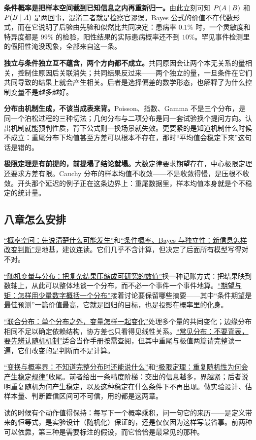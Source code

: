 \textbf{条件概率是把样本空间截到已知信息之内再重新归一。}由此立刻可知 \(P(A\mid B)\) 和 \(P(B\mid A)\) 是两回事，混淆二者就是检察官谬误。Bayes 公式的价值不在代数形式，而在它说明了后验由先验和似然比共同决定：患病率 \(0.1\%\) 时，一个灵敏度和特异度都是 \(99\%\) 的检验，阳性结果的实际患病概率还不到 \(10\%\)。罕见事件检测里的假阳性淹没现象，全部来自这一条。

\textbf{独立与条件独立互不蕴含，两个方向都不成立。}共同原因会让两个本无关系的量相关，控制住原因后关联消失；共同结果反过来——两个独立的量，一旦条件在它们共同导致的结果上就会产生相关。后者是选择偏差的数学形态，也解释了为什么控制变量不是越多越好。

\textbf{分布由机制生成，不该当成表来背。}Poisson、指数、Gamma 不是三个分布，是同一个泊松过程的三种切法；几何分布与二项分布是同一套试验换个提问方向。认出机制就能预判性质，背下公式则一换场景就失效。更要紧的是知道机制什么时候不成立：重尾分布下均值甚至方差可以根本不存在，那时``平均值会稳定下来''这句话是错的。

\textbf{极限定理是有前提的，前提塌了结论就塌。}大数定律要求期望存在，中心极限定理还要求方差有限。Cauchy 分布的样本均值不收敛——不是收敛得慢，是压根不收敛。开头那个延迟的例子正在这条边界上：重尾数据里，样本均值本身就是个不稳定的统计量。

\subsection{八章怎么安排}

\hyperref[ch:037]{``概率空间：先说清楚什么可能发生''}和\hyperref[ch:038]{``条件概率、Bayes 与独立性：新信息怎样改变判断''}是地基，建议连读。它们几乎不含计算，但决定了后面所有模型写得对不对。

\hyperref[ch:039]{``随机变量与分布：把复杂结果压缩成可研究的数值''}换一种记账方式：把结果映到数轴上，从此可以整体地谈一个分布，而不必一个事件一个事件地算。\hyperref[ch:040]{``期望与矩：怎样用少量数字概括一个分布''}接着讨论要保留哪些摘要——其中``条件期望是最佳预测''一篇价值最高，它就是回归的目标，也是投影在概率里的化身。

\hyperref[ch:041]{``联合分布：单个分布之外，变量怎样一起变化''}处理多个量的共同变化；边缘分布相同不足以确定依赖结构，协方差也只看得见线性关系。\hyperref[ch:042]{``常见分布：不要背表，要先辨认随机机制''}适合当作手册按需查阅，但其中重尾与极值两篇请完整读一遍，它们改变的是判断而不是计算。

\hyperref[ch:043]{``变换与概率界：不知道完整分布时还能说什么''}和\hyperref[ch:044]{``极限定理：重复随机性为何会产生稳定规律''}收尾。前者给出一条精度阶梯：交出的信息越多，界越紧；后者说明重复随机为何产生稳定，以及这种稳定在什么条件下不再出现。做实验设计、估样本量、判断置信区间可不可信，用的都是这两章。

读的时候有个动作值得保持：每写下一个概率乘积，问一句它的来历——是定义带来的恒等式，是实验设计（随机化）保证的，还是仅仅因为这样写最省事。前两种可以依靠，第三种是需要标注的假设，而它恰恰是最常见的那种。

